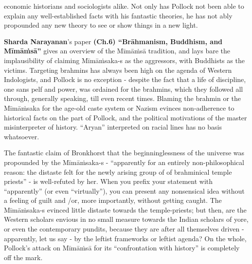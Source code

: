 economic historians and sociologists alike. Not only has Pollock not been able to explain any well-established facts with his fantastic theories, he has not ably propounded any new theory to see or show things in a new light.


\textbf{Sharda Narayanan}’s paper \textbf{(Ch.6) “Brāhmanism, Buddhism, and Mīmāṁsā”} gives an overview of the Mīmāṁsā tradition, and lays bare the implausibility of claiming Mīmāṁsaka-s as the aggressors, with Buddhists as the victims. Targeting brahmins has always been high on the agenda of Western Indologists, and Pollock is no exception - despite the fact that a life of discipline, one sans pelf and power, was ordained for the brahmins, which they followed all through, generally speaking, till even recent times. Blaming the brahmin or the Mīmāṁsaka for the age-old caste system or Nazism evinces non-adherence to historical facts on the part of Pollock, and the political motivations of the master misinterpreter of history. “Aryan” interpreted on racial lines has no basis whatsoever.

The fantastic claim of Bronkhorst that the beginninglessness of the universe was propounded by the Mīmāṁsaka-s - “apparently for an entirely non-philosophical reason: the distaste felt for the newly arising group of of brahminical temple priests” - is well-refuted by her. When you prefix your statement with “apparently” (or even “virtually”), you can present any nonsensical idea without a feeling of guilt and /or, more importantly, without getting caught. The Mīmāṁsaka-s evinced little distaste towards the temple-priests; but then, are the Western scholars envious in no small measure towards the Indian scholars of yore, or even the contemporary pundits, because they are after all themselves driven - apparently, let us say - by the leftist frameworks or leftist agenda? On the whole, Pollock’s attack on Mīmāṁsā for its “confrontation with history” is completely off the mark.

